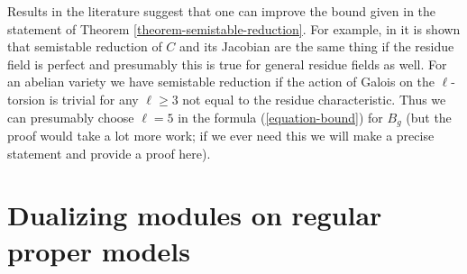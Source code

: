 \begin{remark}
\label{remark-improving-bound}
Results in the literature suggest that one can improve the bound
given in the statement of Theorem \ref{theorem-semistable-reduction}.
For example, in \cite{DM} it is shown that semistable reduction
of $C$ and its Jacobian are the same thing if the residue field is perfect
and presumably this is true for general residue fields as well.
For an abelian variety we have semistable reduction if the action of Galois
on the $\ell$-torsion is trivial for any $\ell \geq 3$ not equal to the
residue characteristic. Thus we can presumably choose $\ell = 5$
in the formula (\ref{equation-bound}) for $B_g$
(but the proof would take a lot more work; if we ever need this
we will make a precise statement and provide a proof here).
\end{remark}











\section{Dualizing modules on regular proper models}
\label{section-dualizing}

